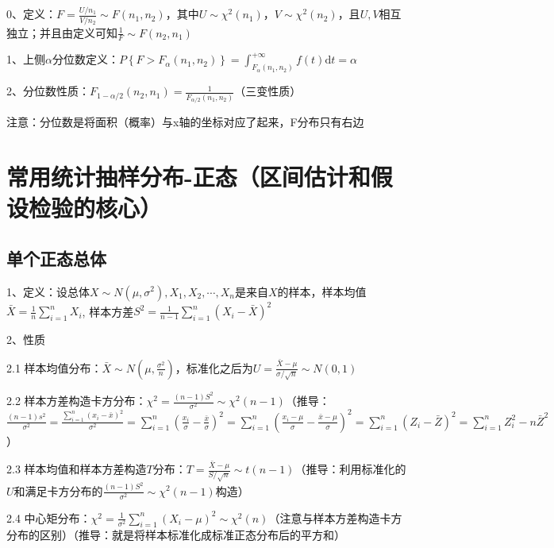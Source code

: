 0、定义：$F=\frac{U / n_{1}}{V / n_{2}} \sim F\left(n_{1}, n_{2}\right)$，其中$U \sim \chi^{2}\left(n_{1}\right)$，$ V \sim \chi^{2}\left(n_{2}\right)$，且$U,V$相互独立；并且由定义可知$\frac{1}{F} \sim F\left(n_{2}, n_{1}\right)$

1、上侧$\alpha$分位数定义：$P\left\{F>F_{\alpha}\left(n_{1}, n_{2}\right)\right\}=\int_{F_{\alpha}\left(n_{1}, n_{2}\right)}^{+\infty} f(t) \mathrm{d} t=\alpha$

2、分位数性质：$F_{1-\alpha/2}(n_{2},n_{1})=\frac{1}{F_{{\alpha}/{2}}\left(n_{1}, n_{2}\right)}$（三变性质）

注意：分位数是将面积（概率）与x轴的坐标对应了起来，F分布只有右边

\section{常用统计抽样分布-正态（区间估计和假设检验的核心）}



\subsection{单个正态总体}

1、定义：设总体$X \sim N\left(\mu, \sigma^{2}\right), X_{1}, X_{2},\cdots, X_{n}$是来自$X$的样本，样本均值$\bar{X}=\frac{1}{n} \sum_{i=1}^{n} X_{i}$, 样本方差$S^{2}=\frac{1}{n-1} \sum_{i=1}^{n}\left(X_{i}-\bar{X}\right)^{2}$

2、性质

2.1 样本均值分布：$\bar{X} \sim N\left(\mu, \frac{\sigma^{2}}{n}\right)$，标准化之后为$U=\frac{\bar{X}-\mu}{\sigma / \sqrt{n}} \sim N(0,1)$

2.2 样本方差构造卡方分布：$\chi^{2}=\frac{(n-1) S^{2}}{\sigma^{2}} \sim \chi^{2}(n-1)$（推导：$\frac{(n-1) s^{2}}{\sigma^{2}} =\frac{\sum_{i=1}^{n}\left(x_{i}-\bar{x}\right)^{2}}{\sigma^{2}} =\sum_{i=1}^{n}\left(\frac{x_{i}}{\sigma}-\frac{\bar{x}}{\sigma}\right)^{2} =\sum_{i=1}^{n}\left(\frac{x_{i}-\mu}{\sigma}-\frac{\bar{x}-\mu}{\sigma}\right)^{2} =\sum_{i=1}^{n}\left(Z_{i}-\bar{Z}\right)^{2} =\sum_{i=1}^{n} Z_{i}^{2}-n \bar{Z}^{2}$）

2.3 样本均值和样本方差构造$T$分布：$T=\frac{\bar{X}-\mu}{S / \sqrt{n}} \sim t(n-1)$（推导：利用标准化的$U$和满足卡方分布的$\frac{(n-1) S^{2}}{\sigma^{2}} \sim \chi^{2}(n-1)$构造）

2.4 中心矩分布：$\chi^{2}=\frac{1}{\sigma^{2}} \sum_{i=1}^{n}\left(X_{i}-\mu\right)^{2} \sim \chi^{2}(n)$（注意与样本方差构造卡方分布的区别）（推导：就是将样本标准化成标准正态分布后的平方和）



